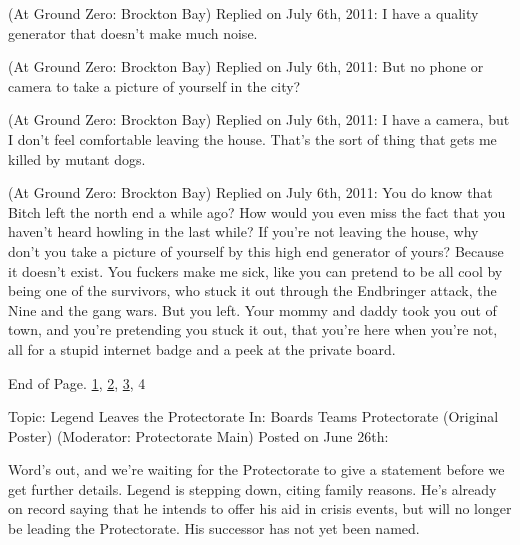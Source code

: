 \blacktriangleright {}(At Ground Zero: Brockton Bay)
Replied on July 6th, 2011:
I have a quality generator that doesn't make much noise.



\blacktriangleright {}(At Ground Zero: Brockton Bay)
Replied on July 6th, 2011:
But no phone or camera to take a picture of yourself in the city?



\blacktriangleright {}(At Ground Zero: Brockton Bay)
Replied on July 6th, 2011:
I have a camera, but I don't feel comfortable leaving the house.  That's the sort of thing that gets me killed by mutant dogs.



\blacktriangleright {} (At Ground Zero: Brockton Bay)
Replied on July 6th, 2011:
You do know that Bitch left the north end a while ago?  How would you even miss the fact that you haven't heard howling in the last while?  If you're not leaving the house, why don't you take a picture of yourself by this high end generator of yours?  Because it doesn't exist.
You fuckers make me sick, like you can pretend to be all cool by being one of the survivors, who stuck it out through the Endbringer attack, the Nine and the gang wars.  But you left.  Your mommy and daddy took you out of town, and you're pretending you stuck it out, that you're here when you're not, all for a stupid internet badge and a peek at the private board.



End of Page.   \underline{1}, \underline{2}, \underline{3}, 4



\sectionbreak



\blacklozenge  Topic:  Legend Leaves the Protectorate
In:  Boards \blacktriangleright Teams \blacktriangleright Protectorate (Original Poster) (Moderator: Protectorate Main)
Posted on June 26th:



Word's out, and we're waiting for the Protectorate to give a statement before we get further details.  Legend is stepping down, citing family reasons.  He's already on record saying that he intends to offer his aid in crisis events, but will no longer be leading the Protectorate.  His successor has not yet been named.






